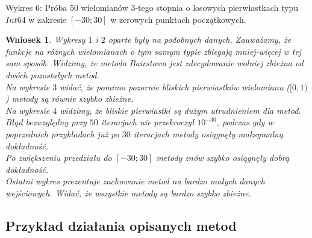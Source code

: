 \documentclass{article}
\newtheorem{wniosek}{Wniosek}
\begin{document}
Wykres 6:
Próba $50$ wielomianów $3$-tego stopnia o losowych pierwiastkach typu $Int64$ w zakresie $[-30;30]$ w zerowych punktach początkowych.

\pagebreak

\begin{wniosek}
Wykresy $1$ i $2$ oparte były na podobnych danych. Zauważamy, że funkcje na różnych wielomianach o tym samym typie zbiegają mniej-więcej w tej sam sposób. Widzimy, że metoda Bairstowa jest zdecydowanie wolniej zbieżna od dwóch pozostałych metod.\\

Na wykresie $3$ widać, że pomimo pozornie bliskich pierwiastków wielomianu ($[0,1)$) metody są równie szybko zbieżne.\\

Na wykresie $4$ widzimy, że bliskie pierwiastki są dużym utrudnieniem dla metod.
Błąd bezwzględny przy $50$ iteracjach nie przekroczył $10^{-30}$, podczas gdy w poprzednich przykładach już po $30$ iteracjach metody osiągnęły maksymalną dokładność.\\

Po zwiększeniu przedziału do $[-30;30]$ metody znów szybko osiągnęły dobrą dokładność.\\

Ostatni wykres prezentuje zachowanie metod na bardzo małych danych wejściowych. Widać, że wszystkie metody są bardzo szybko zbieżne.

\end{wniosek}

\subsection{Przykład działania opisanych metod}
\end{document}
